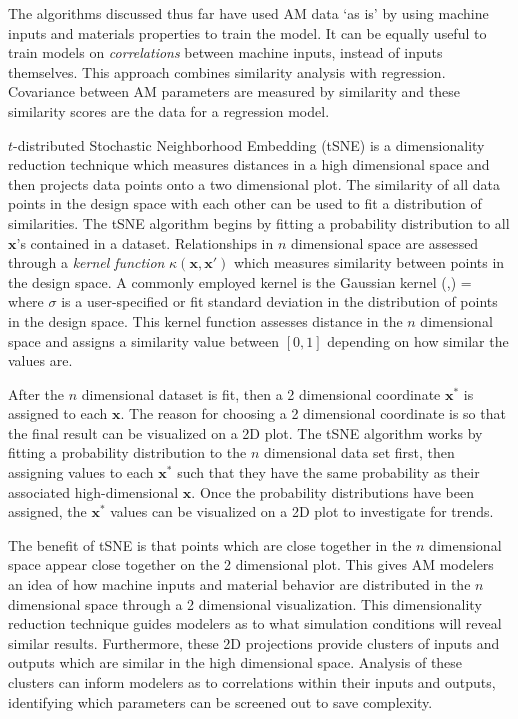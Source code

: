 The algorithms discussed thus far have used AM data `as is' by using machine inputs and materials properties to train the model. It can be equally useful to train models on \textit{correlations} between machine inputs, instead of inputs themselves. This approach combines similarity analysis with regression. Covariance between AM parameters are measured by similarity and these similarity scores are the data for a regression model. 

$t$-distributed Stochastic Neighborhood Embedding (tSNE) is a dimensionality reduction technique which measures distances in a high dimensional space and then projects data points onto a two dimensional plot. The similarity of all data points in the design space with each other can be used to fit a distribution of similarities. The tSNE algorithm begins by fitting a probability distribution to all $\mathbf{x}$'s contained in a dataset. Relationships in $n$ dimensional space are assessed through a \textit{kernel function} $\kappa(\mathbf{x},\mathbf{x'})$ which measures similarity between points in the design space. A commonly employed kernel is the Gaussian kernel
\eqn
	\kappa(,) = 
	\label{gausskernel}
\equ 
where $\sigma$ is a user-specified or fit standard deviation in the distribution of points in the design space. This kernel function assesses distance in the $n$ dimensional space and assigns a similarity value between $\left[0, 1\right]$ depending on how similar the values are. 

 After the $n$ dimensional dataset is fit, then a 2 dimensional coordinate $\mathbf{x}^*$ is assigned to each $\mathbf{x}$. The reason for choosing a 2 dimensional coordinate is so that the final result can be visualized on a 2D plot. The tSNE algorithm works by fitting a probability distribution to the $n$ dimensional data set first, then assigning values to each $\mathbf{x}^*$ such that they have the same probability as their associated high-dimensional $\mathbf{x}$. Once the probability distributions have been assigned, the $\mathbf{x}^*$ values can be visualized on a 2D plot to investigate for trends.

The benefit of tSNE is that points which are close together in the $n$ dimensional space appear close together on the 2 dimensional plot. This gives AM modelers an idea of how machine inputs and material behavior are distributed in the $n$ dimensional space through a 2 dimensional visualization. This dimensionality reduction technique guides modelers as to what simulation conditions will reveal similar results. Furthermore, these 2D projections provide clusters of inputs and outputs which are similar in the high dimensional space. Analysis of these clusters can inform modelers as to correlations within their inputs and outputs, identifying which parameters can be screened out to save complexity.


